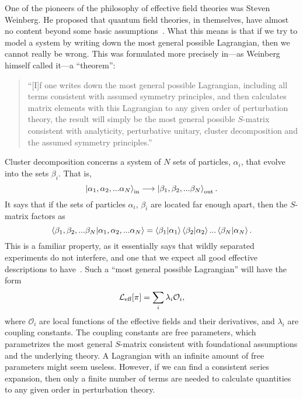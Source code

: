 One of the pioneers of the philosophy of effective field theories was Steven Weinberg.
He proposed that quantum field theories, in themselves, have almost no content beyond some basic assumptions~\autocite{weinbergDevelopmentEffectiveField2021}.
What this means is that if we try to model a system by writing down the most general possible Lagrangian, then we cannot really be wrong.
This was formulated more precisely in---as Weinberg himself called it---a ``theorem'':
\begin{quote}
    ``[I]f one writes down the most general possible Lagrangian, including all terms consistent with assumed symmetry principles, and then calculates matrix elements with this Lagrangian to any given order of perturbation theory, the result will simply be the most general possible $S$-matrix consistent with analyticity, perturbative unitary, cluster decomposition and the assumed symmetry principles.''~\autocite{weinbergPhenomenologicalLagrangians1979}
\end{quote}

Cluster decomposition concerns a system of $N$ sets of particles, $\alpha_i$, that evolve into the sets $\beta_i$.
That is,
\begin{equation}
    \ket{\alpha_1, \alpha_2, ... \alpha_N}_\text{in}
    \longrightarrow
    \ket{\beta_1, \beta_2, ... \beta_N}_\text{out}.
\end{equation}
It says that if the sets of particles $\alpha_i$, $\beta_i$ are located far enough apart, then the $S$-matrix factors as
\begin{equation}
    {\braket{\beta_1, \beta_2, ... \beta_N|\alpha_1, \alpha_2, ... \alpha_N}}
    =
    \braket{\beta_1|\alpha_1}\braket{\beta_2|\alpha_2}... \braket{\beta_N|\alpha_N}.
\end{equation}
This is a familiar property, as it essentially says that wildly separated experiments do not interfere, and one that we expect all good effective descriptions to have~\autocite{weinbergQuantumTheoryFields1995,weinbergQuantumTheoryFields1996}.
Such a ``most general possible Lagrangian'' will have the form
\begin{equation}
    \mathcal{L}_\text{eff}[\pi] = \sum_i \lambda_i \mathcal O_i,
\end{equation}
where $\mathcal O_i$ are local functions of the effective fields and their derivatives, and $\lambda_i$ are coupling constants.
The coupling constants are free parameters, which parametrizes the most general $S$-matrix consistent with foundational assumptions and the underlying theory.
A Lagrangian with an infinite amount of free parameters might seem useless.
However, if we can find a consistent series expansion, then only a finite number of terms are needed to calculate quantities to any given order in perturbation theory.

